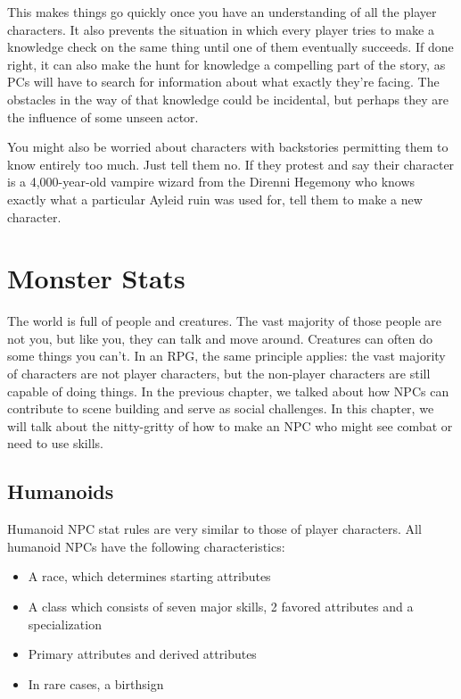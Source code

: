 \documentclass[12pt]{book}
\begin{document}
This makes things go quickly once you have an understanding of all the player characters. It also prevents the situation in which every player tries to make a knowledge check on the same thing until one of them eventually succeeds. If done right, it can also make the hunt for knowledge a compelling part of the story, as PCs will have to search for information about what exactly they're facing. The obstacles in the way of that knowledge could be incidental, but perhaps they are the influence of some unseen actor.

You might also be worried about characters with backstories permitting them to know entirely too much. Just tell them no. If they protest and say their character is a 4,000-year-old vampire wizard from the Direnni Hegemony who knows exactly what a particular Ayleid ruin was used for, tell them to make a new character.

\chapter{Monster Stats}
The world is full of people and creatures. The vast majority of those people are not you, but like you, they can talk and move around. Creatures can often do some things you can't. In an RPG, the same principle applies: the vast majority of characters are not player characters, but the non-player characters are still capable of doing things. In the previous chapter, we talked about how NPCs can contribute to scene building and serve as social challenges. In this chapter, we will talk about the nitty-gritty of how to make an NPC who might see combat or need to use skills.

\section{Humanoids}
Humanoid NPC stat rules are very similar to those of player characters. All humanoid NPCs have the following characteristics:

\begin{itemize}
	\item A race, which determines starting attributes
	\item A class which consists of seven major skills, 2 favored attributes and a specialization
	\item Primary attributes and derived attributes
	\item In rare cases, a birthsign
\end{itemize}
\end{document}
